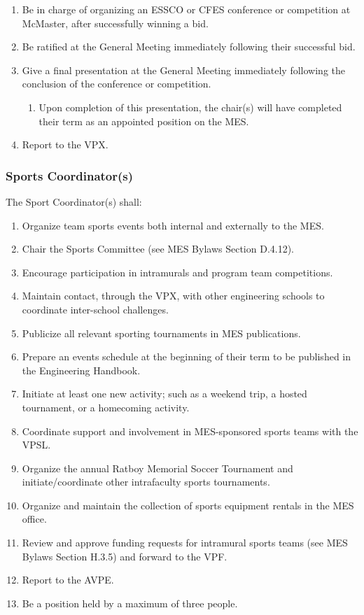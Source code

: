 \begin{enumerate}
 \item
  Be in charge of organizing an ESSCO or CFES conference or competition
  at McMaster, after successfully winning a bid.
 \item
  Be ratified at the General Meeting immediately following their
  successful bid.
 \item
  Give a final presentation at the General Meeting immediately following
  the conclusion of the conference or competition.

  \begin{enumerate}
   \item
    Upon completion of this presentation, the chair(s) will have
    completed their term as an appointed position on the MES.
  \end{enumerate}
 \item
  Report to the VPX.

\end{enumerate}

\hypertarget{sports-coordinators}{%
 \subsubsection{\texorpdfstring{Sports Coordinator(s)
  }{Sports Coordinator(s) }}
 \label{sports-coordinators}}
The Sport Coordinator(s) shall:

\begin{enumerate}
 \item
  Organize team sports events both internal and externally to the MES.
 \item
  Chair the Sports Committee (see MES Bylaws Section D.4.12).
 \item
  Encourage participation in intramurals and program team competitions.
 \item
  Maintain contact, through the VPX, with other engineering schools to
  coordinate inter-school challenges.
 \item
  Publicize all relevant sporting tournaments in MES publications.
 \item
  Prepare an events schedule at the beginning of their term to be
  published in the Engineering Handbook.
 \item
  Initiate at least one new activity; such as a weekend trip, a hosted
  tournament, or a homecoming activity.
 \item
  Coordinate support and involvement in MES-sponsored sports teams with
  the VPSL.
 \item
  Organize the annual Ratboy Memorial Soccer Tournament and
  initiate/coordinate other intrafaculty sports tournaments.
 \item
  Organize and maintain the collection of sports equipment rentals in
  the MES office.
 \item
  Review and approve funding requests for intramural sports teams (see
  MES Bylaws Section H.3.5) and forward to the VPF.
 \item
  Report to the AVPE.
 \item
  Be a position held by a maximum of three people.

\end{enumerate}


